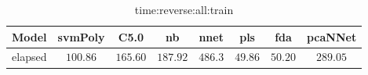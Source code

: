 \begin{table}[!ht]
	\centering
	\begin{tabular}{|c|c|c|c|c|c|c|c|}
		\hline
		Model & svmPoly & C5.0 & nb & nnet & pls & fda & pcaNNet \\ \hline
		elapsed & $100.86$ & $165.60$ & $187.92$ & $486.3$ & $49.86$ & $50.20$ & $289.05$ \\ \hline
	\end{tabular}
	\caption{time:reverse:all:train}
	\label{tab:time:reverse:all:train}
\end{table}
